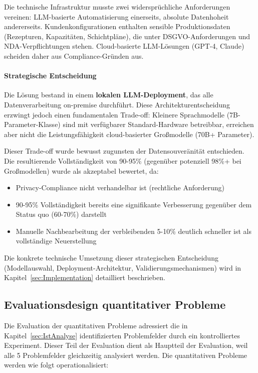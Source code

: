 Die technische Infrastruktur musste zwei widersprüchliche Anforderungen vereinen: LLM-basierte Automatisierung einerseits, absolute Datenhoheit andererseits. Kundenkonfigurationen enthalten sensible Produktionsdaten (Rezepturen, Kapazitäten, Schichtpläne), die unter DSGVO-Anforderungen und NDA-Verpflichtungen stehen. Cloud-basierte LLM-Lösungen (GPT-4, Claude) scheiden daher aus Compliance-Gründen aus.

\paragraph{Strategische Entscheidung}

Die Lösung bestand in einem \textbf{lokalen LLM-Deployment}, das alle Datenverarbeitung on-premise durchführt. Diese Architekturentscheidung erzwingt jedoch einen fundamentalen Trade-off: Kleinere Sprachmodelle (7B-Parameter-Klasse) sind mit verfügbarer Standard-Hardware betreibbar, erreichen aber nicht die Leistungsfähigkeit cloud-basierter Großmodelle (70B+ Parameter).

\noindent Dieser Trade-off wurde bewusst zugunsten der Datensouveränität entschieden. Die resultierende Vollständigkeit von 90-95\% (gegenüber potenziell 98\%+ bei Großmodellen) wurde als akzeptabel bewertet, da:

\begin{itemize}
    \item Privacy-Compliance nicht verhandelbar ist (rechtliche Anforderung)
    \item 90-95\% Vollständigkeit bereits eine signifikante Verbesserung gegenüber dem Status quo (60-70\%) darstellt
    \item Manuelle Nachbearbeitung der verbleibenden 5-10\% deutlich schneller ist als vollständige Neuerstellung
\end{itemize}

\noindent Die konkrete technische Umsetzung dieser strategischen Entscheidung (Modellauswahl, Deployment-Architektur, Validierungsmechanismen) wird in Kapitel~\ref{sec:Implementation} detailliert beschrieben.

\subsection{Evaluationsdesign quantitativer Probleme}
\label{subsec:Evaluationsdesign}

Die Evaluation der quantitativen Probleme adressiert die in Kapitel~\ref{sec:IstAnalyse} identifizierten Problemfelder durch ein kontrolliertes Experiment. Dieser Teil der Evaluation dient als Hauptteil der Evaluation, weil alle 5 Problemfelder gleichzeitig analysiert werden. Die quantitativen Probleme werden wie folgt operationalisiert:

